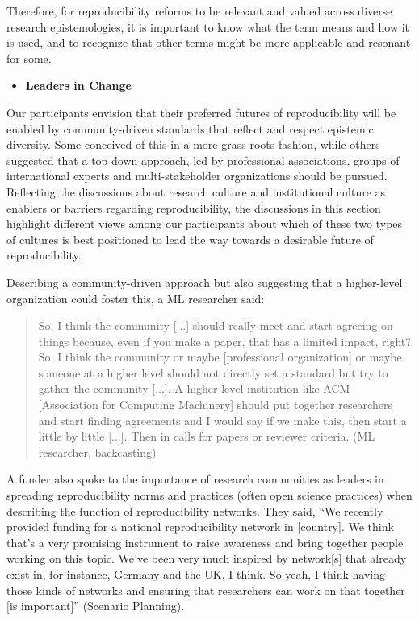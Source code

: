 \documentclass[authordate, meta]{jote-new-article}
\begin{document}
	Therefore, for reproducibility reforms to be relevant and valued across diverse research epistemologies, it is important to know what the term means and how it is used, and to recognize that other terms might be more applicable and resonant for some.


\begin{itemize}[after=\vspace{-\baselineskip}]
	\item \textbf{Leaders in Change}
\end{itemize}



	\noindent Our participants envision that their preferred futures of reproducibility will be enabled by community-driven standards that reflect and respect epistemic diversity. Some conceived of this in a more grass-roots fashion, while others suggested that a top-down approach, led by professional associations, groups of international experts and multi-stakeholder organizations should be pursued. Reflecting the discussions about research culture and institutional culture as enablers or barriers regarding reproducibility, the discussions in this section highlight different views among our participants about which of these two types of cultures is best positioned to lead the way towards a desirable future of reproducibility.







	Describing a community-driven approach but also suggesting that a higher-level organization could foster this, a ML researcher said:



	\begin{quote}So, I think the community [...] should really meet and start agreeing on things because, even if you make a paper, that has a limited impact, right? So, I think the community or maybe [professional organization] or maybe someone at a higher level should not directly set a standard but try to gather the community [...]. A higher-level institution like ACM [Association for Computing Machinery] should put together researchers and start finding agreements and I would say if we make this, then start a little by little [...]. Then in calls for papers or reviewer criteria. (ML researcher, backcasting)\end{quote}



	A funder also spoke to the importance of research communities as leaders in spreading reproducibility norms and practices (often open science practices) when describing the function of reproducibility networks. They said, “We recently provided funding for a national reproducibility network in [country]. We think that's a very promising instrument to raise awareness and bring together people working on this topic. We've been very much inspired by network[s] that already exist in, for instance, Germany and the UK, I think. So yeah, I think having those kinds of networks and ensuring that researchers can work on that together [is important]” (Scenario Planning).
\end{document}
